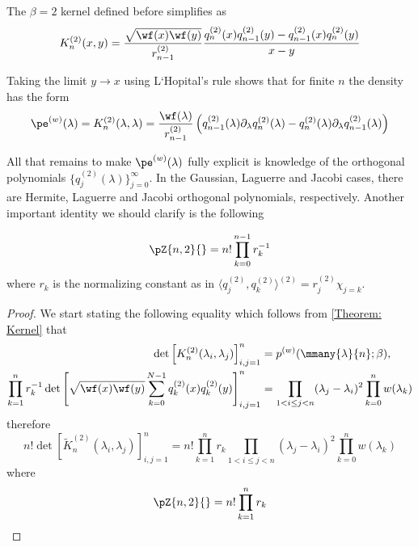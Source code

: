 \begin{proposicao}
	The $\beta=2$ kernel defined before simplifies as
	\begin{equation}
		K_n^{(2)}(x,y) = \frac{\sqrt{\wf(x) \wf(y)}}{r_{n-1}^{(2)}} \frac{q_n^{(2)}(x)q_{n-1}^{(2)}(y) - q_{n-1}^{(2)}(x)q_n^{(2)}(y)}{x-y}
	\end{equation}
	\label{proposicaoosition: Kernel Simplification beta 2}
\end{proposicao}
Taking the limit $y \rightarrow x$ using L`Hopital's rule shows that for finite $n$ the density has the form
\begin{equation}
	\pe^{(w)}(\lambda) = K_n^{(2)}(\lambda, \lambda) = \frac{\wf(\lambda)}{r_{n-1}^{(2)}} \left( q_{n-1}^{(2)}(\lambda)\partial_\lambda q_{n}^{(2)}(\lambda) - q_{n}^{(2)}(\lambda)\partial_\lambda q_{n-1}^{(2)}(\lambda)  \right)
	\label{Equation: Equilibrium Measure and Kernel}
\end{equation}

All that remains to make $\pe^{(w)}(\lambda)$ fully explicit is knowledge of the orthogonal polynomials $\{q_j^{(2)}(\lambda)\}_{j=0}^\infty$. In the Gaussian, Laguerre and Jacobi cases, there are Hermite, Laguerre and Jacobi orthogonal polynomials, respectively. Another important identity we should clarify is the following

\begin{proposicao}
	\begin{equation}
		\pZ{n,2}{} = n! \prod_{k=0}^{n-1} r_k^{-1}
	\end{equation}
	where $r_k$ is the normalizing constant as in $\langle q_j^{(2)}, q_k^{(2)} \rangle^{(2)} = r_j^{(2)} \chi_{j=k}$.
	\label{proposicaoosition: Partition function}
\end{proposicao}
\begin{proof}
	We start stating the following equality which follows from \ref{Theorem: Kernel} that
	\begin{align}
			\det\left[ K_n^{(2)}(\lambda_i, \lambda_j) \right]_{i,j=1}^{n} & =  p^{(w)}(\mmany{\lambda}{n};\beta), \\
			\prod_{k=1}^n r_k^{-1}  \det\left[ \sqrt{\wf(x) \wf(y)} \sum_{k=0}^{N-1} q_k^{(2)}(x) q_k^{(2)}(y) \right]_{i,j=1}^{n} & = \prod_{1 < i \leq j < n} (\lambda_j - \lambda_i)^2 \prod_{k=0}^{n} w(\lambda_k)
	\end{align}
	therefore
	\begin{equation}
		n! \det\left[ \tilde{K}_n^{(2)}(\lambda_i, \lambda_j) \right]_{i,j=1}^{n} = n! \prod_{k=1}^n r_k \prod_{1 < i \leq j < n} (\lambda_j - \lambda_i)^2 \prod_{k=0}^{n} w(\lambda_k)
	\end{equation}
	where
	\begin{equation}
		\pZ{n,2}{} = n! \prod_{k=1}^n r_k
	\end{equation}
\end{proof}